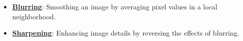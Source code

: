 \documentclass{article}%
\begin{document}
\begin{itemize}[leftmargin=*]
\item \href{https://purdue.brightspace.com/d2l/common/assets/pdfjs-d2l-dist/1.0.14-legacy/web/viewer.html?file=%2Fcontent%2Fenforced%2F1095467-wl.202510.CS.24300.001%2F07L2-Vision.pdf%3Fou%3D1095467&lang=en-us&container=d2l-fileviewer-rendered-pdf&fullscreen=d2l-fileviewer-rendered-pdf-dialog&height=667#page=50}{\textbf{Blurring}}: Smoothing an image by averaging pixel values in a local neighborhood.%
\item \href{https://purdue.brightspace.com/d2l/common/assets/pdfjs-d2l-dist/1.0.14-legacy/web/viewer.html?file=%2Fcontent%2Fenforced%2F1095467-wl.202510.CS.24300.001%2F07L2-Vision.pdf%3Fou%3D1095467&lang=en-us&container=d2l-fileviewer-rendered-pdf&fullscreen=d2l-fileviewer-rendered-pdf-dialog&height=667#page=52}{\textbf{Sharpening}}: Enhancing image details by reversing the effects of blurring.%
\end{itemize}%
\end{document}
